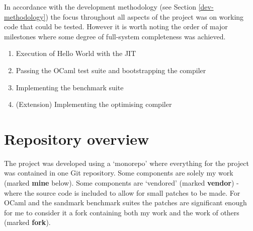 In accordance with the development methodology (see Section \ref{dev-methodology}) the focus
throughout all aspects of the project was on working code that could be tested. However it is worth
noting the order of major milestones where some degree of full-system completeness was achieved.

\begin{enumerate}
      \item Execution of Hello World with the JIT
      \item Passing the OCaml test suite and bootstrapping the compiler
      \item Implementing the benchmark suite
      \item (Extension) Implementing the optimising compiler
\end{enumerate}

\section{Repository overview}

The project was developed using a `monorepo' where everything for the project was contained in one
Git repository. Some components are solely my work (marked \textbf{mine} below). Some components
are `vendored' (marked \textbf{vendor}) - where the source code is included to allow for small
patches to be made. For OCaml and the sandmark benchmark suites the patches are significant enough
for me to consider it a fork containing both my work and the work of others (marked \textbf{fork}).


